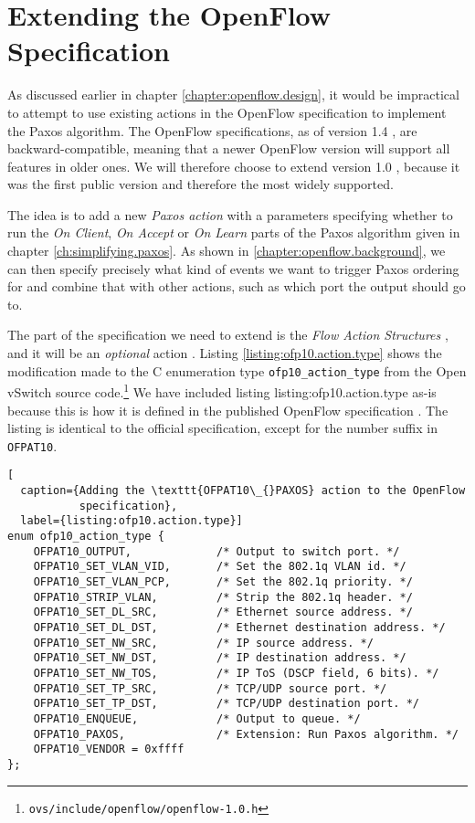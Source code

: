 \section{Extending the OpenFlow Specification}

As discussed earlier in chapter \ref{chapter:openflow.design}, it would be
impractical to attempt to use existing actions in the OpenFlow specification
to implement the Paxos algorithm.
%
The OpenFlow specifications, as of version 1.4 \cite{openflow-1.4}, are
backward-compatible, meaning that a newer OpenFlow version will support all
features in older ones.  We will therefore choose to extend version 1.0
\cite{openflow-1.0}, because it was the first public version and therefore
the most widely supported.

The idea is to add a new \textit{Paxos action} with a parameters 
specifying whether to run the \textit{On Client}, \textit{On Accept} or 
\textit{On Learn} parts of the Paxos algorithm given in chapter
\vref{ch:simplifying.paxos}.
%
As shown in \vref{chapter:openflow.background}, we can then specify
precisely what kind of events we want to trigger Paxos ordering for and
combine that with other actions, such as which port the output should go to.

The part of the specification we need to extend is the 
\textit{Flow Action Structures} \cite[pp.~21--22]{openflow-1.0},
and it will be an \textit{optional} action \cite[pp.~3--6]{openflow-1.0}.
%
Listing \ref{listing:ofp10.action.type} shows the modification made to
the C enumeration type \texttt{ofp10\_{}action\_{}type} from the
Open vSwitch source
code.\footnote{\texttt{ovs/include/openflow/openflow-1.0.h}}
We have included listing listing:ofp10.action.type as-is because this is how
it is defined in the published OpenFlow specification \cite{openflow-1.0}.
%
The listing is identical to the official specification, except for the
number suffix in \texttt{OFPAT10}.

\begin{lstlisting}[
  caption={Adding the \texttt{OFPAT10\_{}PAXOS} action to the OpenFlow
           specification},
  label={listing:ofp10.action.type}]
enum ofp10_action_type {
    OFPAT10_OUTPUT,             /* Output to switch port. */
    OFPAT10_SET_VLAN_VID,       /* Set the 802.1q VLAN id. */
    OFPAT10_SET_VLAN_PCP,       /* Set the 802.1q priority. */
    OFPAT10_STRIP_VLAN,         /* Strip the 802.1q header. */
    OFPAT10_SET_DL_SRC,         /* Ethernet source address. */
    OFPAT10_SET_DL_DST,         /* Ethernet destination address. */
    OFPAT10_SET_NW_SRC,         /* IP source address. */
    OFPAT10_SET_NW_DST,         /* IP destination address. */
    OFPAT10_SET_NW_TOS,         /* IP ToS (DSCP field, 6 bits). */
    OFPAT10_SET_TP_SRC,         /* TCP/UDP source port. */
    OFPAT10_SET_TP_DST,         /* TCP/UDP destination port. */
    OFPAT10_ENQUEUE,            /* Output to queue. */
    OFPAT10_PAXOS,              /* Extension: Run Paxos algorithm. */
    OFPAT10_VENDOR = 0xffff
};
\end{lstlisting}


